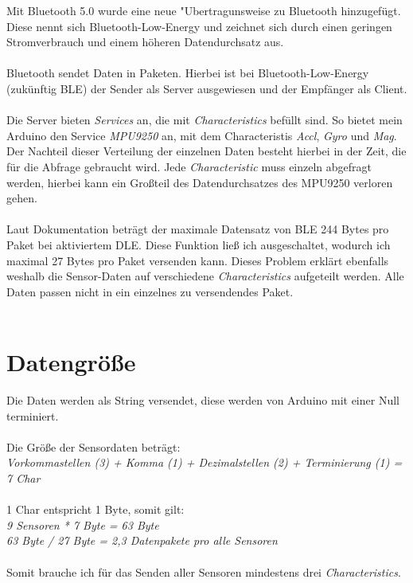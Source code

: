Mit Bluetooth 5.0 wurde eine neue "Ubertragunsweise zu 
Bluetooth hinzugefügt. Diese nennt sich Bluetooth-Low-Energy und zeichnet
sich durch einen geringen Stromverbrauch und einem höheren 
Datendurchsatz aus. \\
\\
Bluetooth sendet Daten in Paketen. Hierbei ist bei Bluetooth-Low-Energy
(zukünftig BLE) der Sender als Server ausgewiesen und der Empfänger als Client.\\
\\
Die Server bieten \textit{Services} an, die mit \textit{Characteristics} befüllt sind.
So bietet mein Arduino den Service \textit{MPU9250} an, mit dem Characteristis \textit{Accl}, \textit{Gyro}
und \textit{Mag}.\\
Der Nachteil dieser Verteilung der einzelnen Daten besteht hierbei in der Zeit, die für die
Abfrage gebraucht wird. Jede \textit{Characteristic} muss einzeln abgefragt werden, hierbei kann ein
Großteil des Datendurchsatzes des MPU9250 verloren gehen.\\
\\
Laut Dokumentation beträgt der maximale Datensatz von BLE 244 Bytes pro Paket bei 
aktiviertem DLE. Diese Funktion ließ ich ausgeschaltet, wodurch ich maximal
27 Bytes pro Paket versenden kann. Dieses Problem erklärt ebenfalls weshalb die Sensor-Daten
auf verschiedene \textit{Characteristics} aufgeteilt werden. Alle Daten passen nicht in ein einzelnes
zu versendendes Paket. \\
\\

\section{Datengröße}
Die Daten werden als String versendet, diese werden von Arduino mit einer
Null terminiert. \\
\\
Die Größe der Sensordaten beträgt:\\
\textit{Vorkommastellen (3) + Komma (1) + Dezimalstellen (2) + Terminierung (1) = 7 Char}\\
\\
1 Char entspricht 1 Byte, somit gilt:\\
\textit{
9 Sensoren * 7 Byte = 63 Byte \\
63 Byte / 27 Byte = 2,3 Datenpakete pro alle Sensoren
}\\
\\
Somit brauche ich für das Senden aller Sensoren mindestens drei \textit{Characteristics}.


